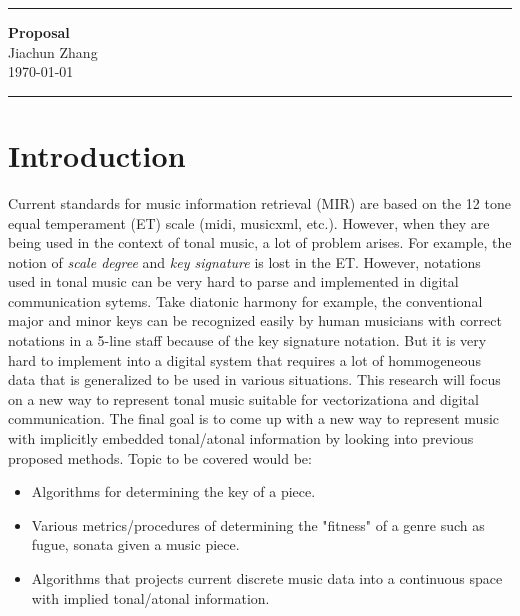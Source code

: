 
\RequirePackage{palatino}
\RequirePackage{verbatim}
\RequirePackage{amsmath,amsfonts,amsthm,amssymb,multirow,xcolor}
\RequirePackage{geometry}
\RequirePackage{graphicx}
\RequirePackage{datetime2}
\renewcommand{\maketitle}{
\hrule height 1pt
\begin{center}
{\bf \large Proposal}\\[2mm]
{Jiachun Zhang}\\[2mm]
{\today}\\
\end{center}
\hrule height 1pt
}
\graphicspath{ {./images/} }
\geometry{left=1in,right=1in,top=1in,bottom=1in}

\maketitle
\section*{Introduction}
Current standards for music information retrieval (MIR) are based on the 
12 tone equal temperament (ET) scale (midi, musicxml, etc.). However, when 
they are being used in the context of tonal music, a lot of problem arises.
For example, the notion of \textit{scale degree} and \textit{key signature} is lost in the ET.
However, notations used in tonal music can be very hard to parse and implemented in 
digital communication sytems. Take diatonic harmony for example, the conventional major
and minor keys can be recognized easily by human musicians with correct notations in 
a 5-line staff because of the key signature notation. But it is very hard to implement 
into a digital system that requires a lot of hommogeneous data that is generalized 
to be used in various situations. This research will focus on a new way to represent 
tonal music suitable for vectorizationa and digital communication. The final goal is to come 
up with a new way to represent music with implicitly embedded tonal/atonal information by looking 
into previous proposed methods.
Topic to be covered would be:
\begin{itemize}
\item Algorithms for determining the key of a piece.
\item Various metrics/procedures of determining the "fitness" of a genre such as fugue, sonata given a music piece.
\item Algorithms that projects current discrete music data into a continuous space with implied 
tonal/atonal information.
\end{itemize}

